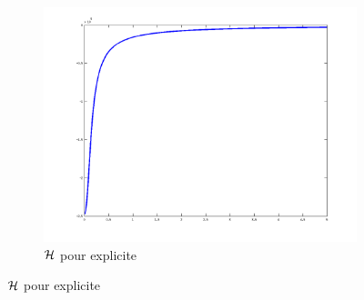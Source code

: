 \begin{figure}
\begin{subfigure}[b]{0.3\textwidth}
    \includegraphics[width=\textwidth]{images/Q2_explicite_H.png}
    \caption{$\mathcal{H}$ pour explicite}
    \label{fig:q2_explicite_H}
  \end{subfigure}


\end{figure}
